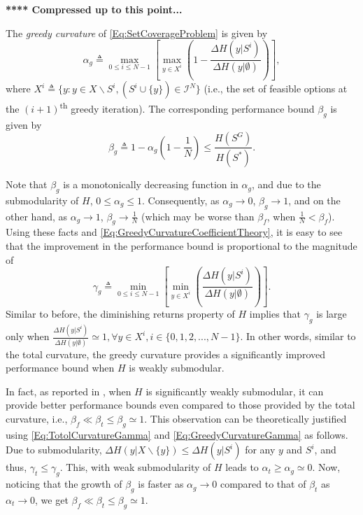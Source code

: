 \documentclass[letterpaper, 10 pt, conference]{ieeeconf}
\newcommand{\tsup}[1]{\textsuperscript{#1}}
\begin{document}
\bigskip
{\color{blue} \textbf{**** Compressed up to this point...} }
\bigskip

The \emph{greedy curvature} of \eqref{Eq:SetCoverageProblem} is given by   
\begin{equation}\label{Eq:GreedyCurvatureCoefficientTheory}
    \alpha_g \triangleq \max_{0 \leq i \leq N-1} \left[ \max_{y \in X^i}\left(1 - \frac{\Delta H(y\vert S^i)}{\Delta H(y\vert \emptyset)}\right) \right],
\end{equation}
where $X^i \triangleq \{y: y \in X \backslash S^i, (S^i \cup \{y\}) \in \mathcal{I}^N\}$ (i.e., the set of feasible options at the $(i+1)$\tsup{th} greedy iteration). The corresponding performance bound $\beta_g$ is given by  
\begin{equation}\label{Eq:GreedyCurvatureBoundTheory}
    \beta_g \triangleq 1-\alpha_g\left(1-\frac{1}{N}\right) \leq \frac{H(S^G)}{H(S^*)}. 
\end{equation}



Note that $\beta_g$ is a monotonically decreasing function in $\alpha_g$, and due to the submodularity of $H$, $0 \leq \alpha_g \leq 1$. Consequently, as $\alpha_g \rightarrow 0$, $\beta_g \rightarrow 1$, and on the other hand, as $\alpha_g \rightarrow 1$, $\beta_g \rightarrow \frac{1}{N}$ (which may be worse than $\beta_f$, when $\frac{1}{N} < \beta_f$). Using these facts and \eqref{Eq:GreedyCurvatureCoefficientTheory}, it is easy to see that the improvement in the performance bound is proportional to the magnitude of 
\begin{equation}\label{Eq:GreedyCurvatureGamma}
    \gamma_g \triangleq \min_{0 \leq i \leq N-1} \left[ \min_{y \in X^i}\left(\frac{\Delta H(y\vert S^i)}{\Delta H(y\vert \emptyset)}\right) \right].
\end{equation}
Similar to before, the diminishing returns property of $H$ implies that $\gamma_g$ is large only when 
$\frac{\Delta H(y\vert S^i)}{\Delta H(y\vert \emptyset)} \simeq 1, \forall y\in X^i, i\in \{0,1,2,...,N-1\}$. In other words, similar to the total curvature, the greedy curvature provides a significantly improved performance bound when $H$ is weakly submodular. 


In fact, as reported in \cite{Sun2020}, when $H$ is significantly weakly submodular, it can provide better performance bounds even compared to those provided by the total curvature, i.e., $\beta_f \ll \beta_t \leq \beta_g \simeq 1$. This observation can be theoretically justified using \eqref{Eq:TotolCurvatureGamma} and \eqref{Eq:GreedyCurvatureGamma} as follows. Due to submodularity, $\Delta H(y \vert X \backslash \{y\}) \leq \Delta H(y\vert S^i)$ for any $y$ and $S^i$, and thus, $\gamma_t \leq \gamma_g$. This, with weak submodularity of $H$ leads to $\alpha_t \geq \alpha_g \simeq 0$. Now, noticing that the growth of $\beta_g$ is faster as $\alpha_g \rightarrow 0$ compared to that of $\beta_t$ as $\alpha_t \rightarrow 0$, we get $\beta_f \ll \beta_t \leq \beta_g \simeq 1$.
\end{document}

